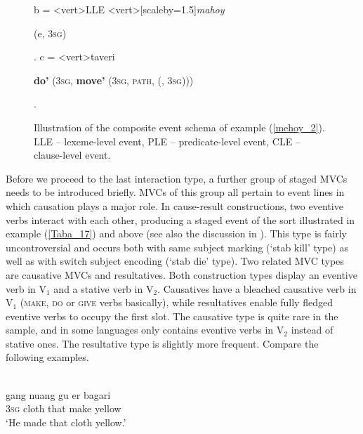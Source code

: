 \begin{sidewaysfigure}
\!b = <vert>{LLE}
<vert>[scaleby=1.5]{\textit{mahoy}}
{\begin{scriptsize} \textbf{} (e, 3\textsc{sg})\end{scriptsize}}.
\!c = <vert>{taveri}
{\begin{scriptsize} \textbf{do'} (3\textsc{sg}, \textbf{move'} (3\textsc{sg}, \textsc{path}, \textbf{} (, 3\textsc{sg}))) \end{scriptsize}}.
\endjtree

\caption[Event schema illustration of example (\ref{mehoy_2})]{Illustration of the composite event schema of example (\ref{mehoy_2}). LLE -- lexeme-level event, PLE -- predicate-level event, CLE -- clause-level event.}
\label{figure:eventschema_mehoy_2}
\end{sidewaysfigure}

Before we proceed to the last interaction type, a further group of staged MVCs needs to be introduced briefly. MVCs of this group all pertain to event lines in which causation plays a major role. In cause-result constructions, two eventive verbs interact with each other, producing a staged event of the sort illustrated in example (\ref{Taba_17}) and  above (see also the discussion in ). This type is fairly uncontroversial and occurs both with same subject marking (`stab kill' type) as well as with switch subject encoding (`stab die' type). Two related MVC types are causative MVCs and resultatives. Both construction types display an eventive verb in V$_1$ and a stative verb in V$_2$. Causatives have a bleached causative verb in V$_1$ (\textsc{make}, \textsc{do} or \textsc{give} verbs basically), while resultatives enable fully fledged eventive verbs to occupy the first slot. The causative type is quite rare in the sample, and in some languages only contains eventive verbs in V$_2$ instead of stative ones. The resultative type is slightly more frequent. Compare the following examples.

\ea \label{Kaera20}
\\
\gll gang nuang gu er bagari \\
3\textsc{sg} cloth that make yellow \\
\glft `He made that cloth yellow.' \\ 
\z

